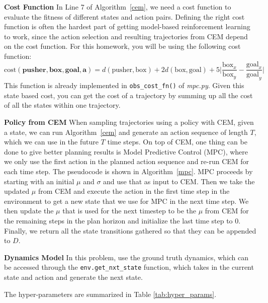 \documentclass[12pt]{article}
\begin{document}
\textbf{Cost Function} In Line 7 of Algorithm~\ref{cem}, we need a cost function to evaluate the fitness of different states and action pairs.  Defining the right cost function is often the hardest part of getting model-based reinforcement learning to work, since the action selection and resulting trajectories from CEM depend on the cost function.  For this homework, you will be using the following cost function:
\begin{equation}
    \text{cost}(\textbf{pusher},\textbf{box},\textbf{goal},\textbf{a}) =d(\text{pusher}, \text{box}) + 2d(\text{box}, \text{goal}) + 5\Big|\frac{\text{box}_x}{\text{box}_y} - \frac{\text{goal}_x}{\text{goal}_y}\Big|
\end{equation}
This function is already implemented in \texttt{obs\_cost\_fn()} of \textit{mpc.py}. Given this state based cost, you can get the cost of a trajectory by summing up all the cost of all the states within one trajectory.

\textbf{Policy from CEM} When sampling trajectories using a policy with CEM, given a state, we can run Algorithm~\ref{cem} and generate an action sequence of length $T$, which we can use in the future $T$ time steps. On top of CEM, one thing can be done to give better planning results is Model Predictive Control (MPC), where we only use the first action in the planned action sequence and re-run CEM for each time step. The pseudocode is shown in Algorithm~\ref{mpc}. MPC proceeds by starting with an initial $\mu$ and $\sigma$ and use that as input to CEM. Then we take the updated $\mu$ from CEM and execute the action in the first time step in the environment to get a new state that we use for MPC in the next time step.  We then update the $\mu$ that is used for the next timestep to be the $\mu$ from CEM for the remaining steps in the plan horizon and initialize the last time step to 0.  Finally, we return all the state transitions gathered so that they can be appended to $D$.  

\textbf{Dynamics Model} In this problem, use the ground truth dynamics, which can be accessed through the \texttt{env.get\_nxt\_state} function, which takes in the current state and action and generate the next state. 

The hyper-parameters are summarized in Table \ref{tab:hyper_params}.
\end{document}
